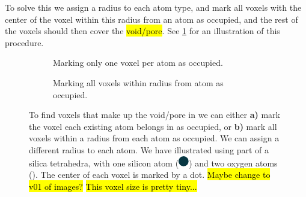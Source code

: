To solve this we assign a radius to each atom type, and mark all voxels with the center of the voxel within this radius from an atom as occupied, and the rest of the voxels should then cover the \hl{void/pore}. See \cref{fig:inject_empty_voxel} for an illustration of this procedure. 
%
\begin{figure}[htpb]%
    \centering%
    \begin{subfigure}[b]{0.45\textwidth}%
        \caption{Marking only one voxel per atom as occupied.}%
    \end{subfigure}%
    \hspace{0.05\textwidth}%
    \begin{subfigure}[b]{0.45\textwidth}%
        \caption{Marking all voxels within radius from atom as occupied.}%
    \end{subfigure}%
    \caption[
        To find voxels that make up the void/pore in we can either \textbf{a)} mark the voxel each existing atom belongs in as occupied, or \textbf{b)} mark all voxels within a radius from each atom as occupied. We can assign a different radius to each atom. We have illustrated using part of a silica tetrahedra, with one silicon atom (the large blue dot) and two oxygen atoms (the smaller red dot). The center of each voxel is marked by a dot 
    ]{%
        To find voxels that make up the void/pore in we can either \textbf{a)} mark the voxel each existing atom belongs in as occupied, or \textbf{b)} mark all voxels within a radius from each atom as occupied. We can assign a different radius to each atom. We have illustrated using part of a silica tetrahedra, with one silicon atom (\includegraphics[scale=0.8]{./images/inject_water/silicon.pdf}) and two oxygen atoms (). The center of each voxel is marked by a dot. \hl{Maybe change to v01 of images?} \hl{This voxel size is pretty tiny...}
    }%
    \label{fig:inject_empty_voxel}%
\end{figure}%

